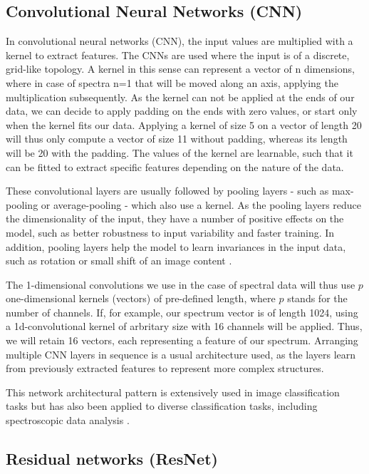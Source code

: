 \subsection{Convolutional Neural Networks (CNN)}
In convolutional neural networks (CNN), the input values are multiplied with a kernel to extract features. The CNNs are used where the input is of a discrete, grid-like topology. A kernel in this sense can represent a vector of n dimensions, where in case of spectra n=1 that will be moved along an axis, applying the multiplication subsequently. As the kernel can not be applied at the ends of our data, we can decide to apply padding on the ends with zero values, or start only when the kernel fits our data. Applying a kernel of size 5 on a vector of length 20 will thus only compute a vector of size 11 without padding, whereas its length will be 20 with the padding.
The values of the kernel are learnable, such that it can be fitted to extract specific features depending on the nature of the data.

These convolutional layers are usually followed by pooling layers - such as max-pooling or average-pooling - which also use a kernel. As the pooling layers reduce the dimensionality of the input, they have a number of positive effects on the model, such as better robustness to input variability and faster training. In addition, pooling layers help the model to learn invariances in the input data, such as rotation or small shift of an image content \cite{goodfellow_deep_2016}. 

The 1-dimensional convolutions we use in the case of spectral data will thus use $p$ one-dimensional kernels (vectors) of pre-defined length, where $p$ stands for the number of channels. If, for example, our spectrum vector is of length 1024, using a 1d-convolutional kernel of arbritary size with 16 channels will be applied. Thus, we will retain 16 vectors, each representing a feature of our spectrum. Arranging multiple CNN layers in sequence is a usual architecture used, as the layers learn from previously extracted features to represent more complex structures.

This network architectural pattern is extensively used in image classification tasks but has also been applied to diverse classification tasks, including spectroscopic data analysis \cite{sun_cnnlstm_2023, castorena_deep_2021, drera_deep_2019}.

\subsection{Residual networks (ResNet)}

